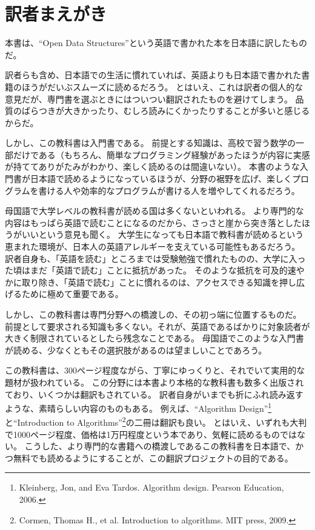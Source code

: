 \chapter*{訳者まえがき}

本書は、``Open Data Structures''という英語で書かれた本を日本語に訳したものだ。

訳者らも含め、日本語での生活に慣れていれば、英語よりも日本語で書かれた書籍のほうがだいぶスムーズに読めるだろう。
とはいえ、これは訳者の個人的な意見だが、専門書を選ぶときにはついつい翻訳されたものを避けてしまう。
品質のばらつきが大きかったり、むしろ読みにくかったりすることが多いと感じるからだ。

しかし、この教科書は入門書である。
前提とする知識は、高校で習う数学の一部だけである（もちろん、簡単なプログラミング経験があったほうが内容に実感が持ててありがたみがわかり、楽しく読めるのは間違いない）。
本書のような入門書が日本語で読めるようになっているほうが、分野の裾野を広げ、楽しくプログラムを書ける人や効率的なプログラムが書ける人を増やしてくれるだろう。

母国語で大学レベルの教科書が読める国は多くないといわれる。
より専門的な内容はもっぱら英語で読むことになるのだから、さっさと崖から突き落としたほうがいいという意見も聞く。
大学生になっても日本語で教科書が読めるという恵まれた環境が、日本人の英語アレルギーを支えている可能性もあるだろう。
訳者自身も、「英語を読む」ところまでは受験勉強で慣れたものの、大学に入った頃はまだ「英語で読む」ことに抵抗があった。
そのような抵抗を可及的速やかに取り除き、「英語で読む」ことに慣れるのは、アクセスできる知識を押し広げるために極めて重要である。

しかし、この教科書は専門分野への橋渡しの、その初っ端に位置するものだ。
前提として要求される知識も多くない。それが、英語であるばかりに対象読者が大きく制限されているとしたら残念なことである。
母国語でこのような入門書が読める、少なくともその選択肢があるのは望ましいことであろう。

この教科書は、300ページ程度ながら、丁寧にゆっくりと、それでいて実用的な題材が扱われている。
この分野には本書より本格的な教科書も数多く出版されており、いくつかは翻訳もされている。
訳者自身がいまでも折にふれ読み返すような、素晴らしい内容のものもある。
例えば、``Algorithm Design''\footnote{Kleinberg, Jon, and Eva Tardos. Algorithm design. Pearson Education, 2006.}と``Introduction to Algorithms''\footnote{Cormen, Thomas H., et al. Introduction to algorithms. MIT press, 2009.}の二冊は翻訳も良い。
とはいえ、いずれも大判で1000ページ程度、価格は1万円程度という本であり、気軽に読めるものではない。
こうした、より専門的な書籍への橋渡しであるこの教科書を日本語で、かつ無料でも読めるようにすることが、この翻訳プロジェクトの目的である。


